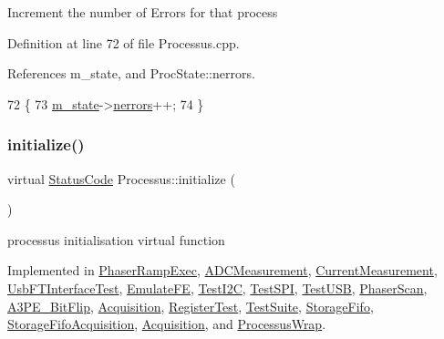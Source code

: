 Increment the number of Errors for that process 

Definition at line 72 of file Processus.\+cpp.



References m\+\_\+state, and Proc\+State\+::nerrors.


\begin{DoxyCode}
72                            \{
73   \hyperlink{classProcessus_ab3539eee42891ceae0baf4395ae7fb61}{m\_state}->\hyperlink{structProcState_a51a0f54ba62b07e07ac8518c5f32828d}{nerrors}++;
74 \}
\end{DoxyCode}
\mbox{\label{classProcessus_aee88ad7b77ae7319cf8b128e9dd2ea11}} 
\subsubsection{\texorpdfstring{initialize()}{initialize()}}
{\footnotesize\ttfamily virtual \hyperlink{classStatusCode}{Status\+Code} Processus\+::initialize (\begin{DoxyParamCaption}{ }\end{DoxyParamCaption})\hspace{0.3cm}{\ttfamily [pure virtual]}}

processus initialisation virtual function 

Implemented in \hyperlink{classPhaserRampExec_ae6f90f2ecf4b66d6f9bc85b123587ef3}{Phaser\+Ramp\+Exec}, \hyperlink{classADCMeasurement_a3fc6d3e863fecc7a1caf91f9b0ca5268}{A\+D\+C\+Measurement}, \hyperlink{classCurrentMeasurement_a88d397682cb5847d5710d08544b6f4c6}{Current\+Measurement}, \hyperlink{classUsbFTInterfaceTest_a68831f83830305e65d830c55af16e878}{Usb\+F\+T\+Interface\+Test}, \hyperlink{classEmulateFE_aeb689a366ed5e675d02d08ee787d338e}{Emulate\+FE}, \hyperlink{classTestI2C_a3f928813a5e26e0f9b6d851e16781a33}{Test\+I2C}, \hyperlink{classTestSPI_ab2c54cd233a04a583d96fde1f81d4bd6}{Test\+S\+PI}, \hyperlink{classTestUSB_ae7cca13f49e4180c93f9f5a3cbd05985}{Test\+U\+SB}, \hyperlink{classPhaserScan_aeb0dccb02754b11c19719962f7c43fb8}{Phaser\+Scan}, \hyperlink{classA3PE__BitFlip_a88dc6cfe690a518e38ff6d89026e6e0c}{A3\+P\+E\+\_\+\+Bit\+Flip}, \hyperlink{classAcquisition_acffc6b70b80811657409f92e489584ba}{Acquisition}, \hyperlink{classRegisterTest_a77354dcd379c33deae6b713a1ba697b5}{Register\+Test}, \hyperlink{classTestSuite_a78793d8c648ce1c47671c263014ab394}{Test\+Suite}, \hyperlink{classStorageFifo_a568becd5cb8d0cb5307a39e0d27fb332}{Storage\+Fifo}, \hyperlink{classStorageFifoAcquisition_a9cf77a05d754282e7737fb439bfa835d}{Storage\+Fifo\+Acquisition}, \hyperlink{classAcquisition_aa73eec1ec46deae89bd3c25551bad86e}{Acquisition}, and \hyperlink{structProcessusWrap_a7cf48f51e6ac8173255417654cc0b499}{Processus\+Wrap}.



